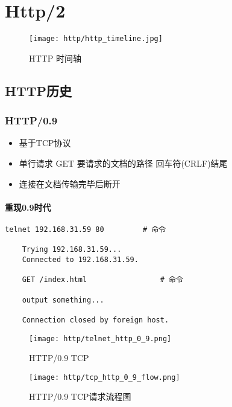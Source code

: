\chapter{Http/2}
\label{chap:h2}

\begin{figure}[H]
    \centering
    \texttt{[image: http/http\_timeline.jpg]}
    \caption{HTTP 时间轴}
\end{figure}




\section{HTTP历史}

\subsection{HTTP/0.9}

\begin{itemize}
    \item 基于TCP协议
    \item 单行请求  GET \qquad 要请求的文档的路径 \qquad  回车符(CRLF)结尾
    \item 连接在文档传输完毕后断开 
\end{itemize}


\subsubsection{重现0.9时代}

\begin{lstlisting}[style=cshell]
    telnet 192.168.31.59 80         # 命令

    Trying 192.168.31.59...
    Connected to 192.168.31.59.

    GET /index.html                 # 命令

    output something... 

    Connection closed by foreign host.
\end{lstlisting}


\begin{figure}[H]
    \centering
    \texttt{[image: http/telnet\_http\_0\_9.png]}
    \caption{HTTP/0.9 TCP}
\end{figure}


\begin{figure}[H]
    \centering
    \texttt{[image: http/tcp\_http\_0\_9\_flow.png]}
    \caption{HTTP/0.9 TCP请求流程图}
\end{figure}





